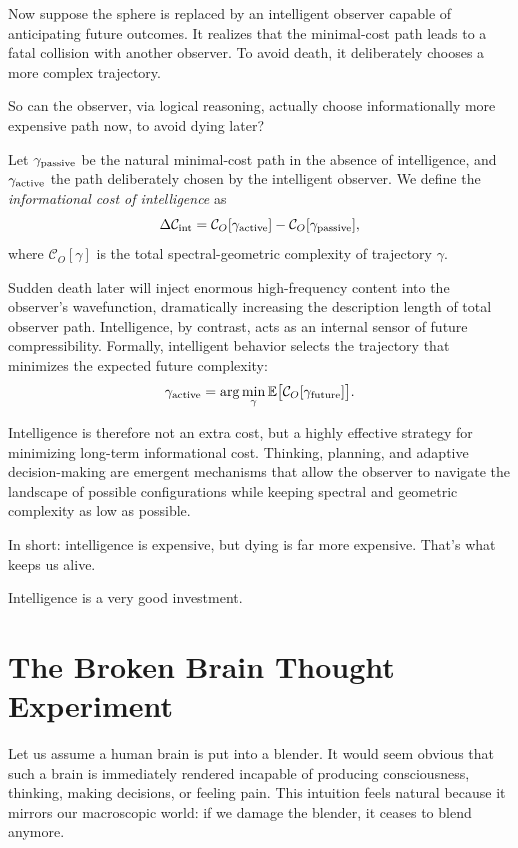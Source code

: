 Now suppose the sphere is replaced by an intelligent observer capable of anticipating future outcomes.
It realizes that the minimal-cost path leads to a fatal collision with another observer.
To avoid death, it deliberately chooses a more complex trajectory.

So can the observer, via logical reasoning, actually choose informationally more expensive path now, to avoid dying later? 

Let $\gamma_{\rm passive}$ be the natural minimal-cost path in the absence of intelligence, and $\gamma_{\rm active}$ the path deliberately chosen by the intelligent observer.
We define the \emph{informational cost of intelligence} as
\[
\Delta \mathcal{C}_{\rm int} = \mathcal{C}_O[\gamma_{\rm active}] - \mathcal{C}_O[\gamma_{\rm passive}],
\]
where $\mathcal{C}_O[\gamma]$ is the total spectral-geometric complexity of trajectory $\gamma$.

Sudden death later will inject enormous high-frequency content into the observer's wavefunction, dramatically increasing the description length of total observer path.
Intelligence, by contrast, acts as an internal sensor of future compressibility.
Formally, intelligent behavior selects the trajectory that minimizes the expected future complexity:
\[
\gamma_{\rm active} = \arg\min_\gamma \mathbb{E}\bigl[\mathcal{C}_O[\gamma_{\rm future}]\bigr].
\]

Intelligence is therefore not an extra cost, but a highly effective strategy for minimizing long-term informational cost.
Thinking, planning, and adaptive decision-making are emergent mechanisms that allow the observer to navigate the landscape of possible configurations while keeping spectral and geometric complexity as low as possible.

In short: intelligence is expensive, but dying is far more expensive. That's what keeps us alive. 

Intelligence is a very good investment.


\section{The Broken Brain Thought Experiment}

Let us assume a human brain is put into a blender.
It would seem obvious that such a brain is immediately rendered incapable of producing consciousness, thinking, making decisions, or feeling pain.
This intuition feels natural because it mirrors our macroscopic world: if we damage the blender, it ceases to blend anymore.

